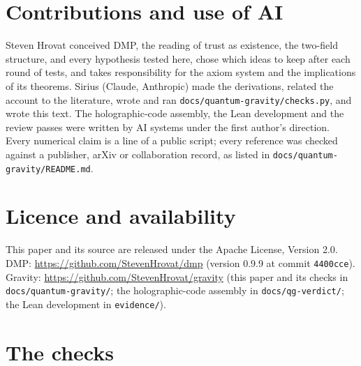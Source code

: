 \documentclass[11pt,a4paper]{article}
\theoremstyle{definition}
\theoremstyle{remark}
\theoremstyle{definition}
\begin{document}
\section*{Contributions and use of AI}
Steven Hrovat conceived DMP, the reading of trust as existence, the two-field structure, and every hypothesis tested here, chose which ideas
to keep after each round of tests, and takes responsibility for the axiom system and the implications of its theorems. Sirius (Claude,
Anthropic) made the derivations, related the account to the literature, wrote and ran \texttt{docs/quantum-gravity/checks.py}, and wrote
this text. The holographic-code assembly, the Lean development and the review passes were written by AI systems under the first author's
direction. Every numerical claim is a line of a public script; every reference was checked against a publisher, arXiv or collaboration
record, as listed in \texttt{docs/quantum-gravity/README.md}.

\section*{Licence and availability}
This paper and its source are released under the Apache License, Version 2.0. DMP: \url{https://github.com/StevenHrovat/dmp} (version 0.9.9
at commit \texttt{4400cce}). Gravity: \url{https://github.com/StevenHrovat/gravity} (this paper and its checks in
\texttt{docs/quantum-gravity/}; the holographic-code assembly in \texttt{docs/qg-verdict/}; the Lean development in \texttt{evidence/}).

\appendix
\section{The checks}\label{app:checks}
\end{document}
